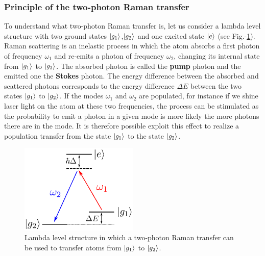  

\subsubsection{Principle of the two-photon Raman transfer}


To understand what two-photon Raman transfer is, let us consider a lambda level structure with two ground states $\ket{g_1}$,$\ket{g_2}$ and one excited state $\ket{e}$ (see Fig.-\ref{fig:raman_level}). Raman scattering is an inelastic process in which the atom absorbs a first photon of frequency $\omega_1$ and re-emits a photon of frequency $\omega_2$, changing its internal state from $\ket{g_1}$ to $\ket{g_2}$. The absorbed photon is called the \textbf{pump} photon and the emitted one the \textbf{Stokes} photon. The energy difference between the absorbed and scattered photons corresponds to the energy difference $\Delta E$ between the two states $\ket{g_1}$ to $\ket{g_2}$. If the modes $\omega_1$ and $\omega_2$ are populated, for instance if we shine laser light on the atom at these two frequencies, the process can be stimulated as the probability to emit a photon in a given mode is more likely the more photons there are in the mode. It is therefore possible exploit this effect to realize a population transfer from the state $\ket{g_1}$ to the state $\ket{g_2}$.


\begin{figure}
    \centering
    \includegraphics[width=0.5\textwidth]{Fig/Chapter3/raman_level.png}
    \caption[Lambda level structure for two-photon Raman transfer]{Lambda level structure in which a two-photon Raman transfer can be used to transfer atoms from $\ket{g_1}$ to $\ket{g_2}$.}
    \label{fig:raman_level}
\end{figure}



